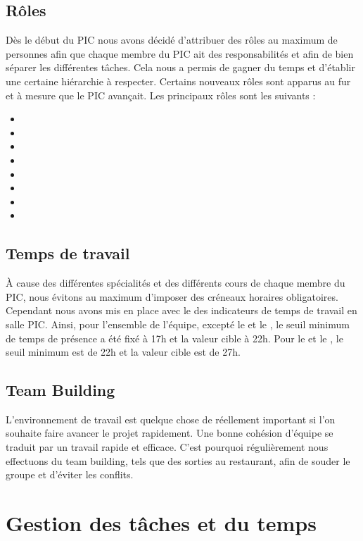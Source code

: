 \documentclass[asi]{picInsa}
\begin{document}
\subsection{Rôles}
Dès le début du PIC nous avons décidé d'attribuer des rôles au maximum de personnes afin que chaque membre du PIC ait des responsabilités et afin de bien séparer les différentes tâches. Cela nous a permis de gagner du temps et d’établir une certaine hiérarchie à respecter. Certains nouveaux rôles sont apparus au fur et à mesure que le PIC avançait. Les principaux rôles sont les suivants : 
\begin{itemize}
	\item \CP{}
	\item \CPA{}
	\item \RQ{}
	\item \RQA{}
	\item \RGC{}
	\item \RD{}
	\item \RRS{}
	\item \RS{}
\end{itemize}

\subsection{Temps de travail}
À cause des différentes spécialités et des différents cours de chaque membre du PIC, nous évitons au maximum d'imposer des créneaux horaires obligatoires. Cependant nous avons mis en place avec le \RQ{} des indicateurs de temps de travail en salle PIC. Ainsi, pour l'ensemble de l'équipe, excepté le \CP{} et le \RQ{}, le seuil minimum de temps de présence a été fixé à 17h et la valeur cible à 22h. Pour le \CP{} et le \RQ{}, le seuil minimum est de 22h et la valeur cible est de 27h.

\subsection{Team Building}
L'environnement de travail est quelque chose de réellement important si l'on souhaite faire avancer le projet rapidement. Une bonne cohésion d'équipe se traduit par un travail rapide et efficace. C'est pourquoi régulièrement nous effectuons du team building, tels que des sorties au restaurant, afin de souder le groupe et d'éviter les conflits.



\section{Gestion des tâches et du temps}
\end{document}
